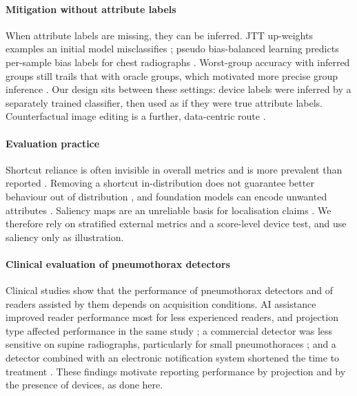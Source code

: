 \documentclass{ieeeaccess}
\begin{document}
\paragraph{Mitigation without attribute labels}
When attribute labels are missing, they can be inferred. JTT up-weights examples an initial model misclassifies \cite{liu2021jtt}; pseudo bias-balanced learning predicts per-sample bias labels for chest radiographs \cite{luo2022pbbl}. Worst-group accuracy with inferred groups still trails that with oracle groups, which motivated more precise group inference \cite{han2024gic}. Our design sits between these settings: device labels were inferred by a separately trained classifier, then used as if they were true attribute labels. Counterfactual image editing is a further, data-centric route \cite{cooke2026roentmod}.

\paragraph{Evaluation practice}
Shortcut reliance is often invisible in overall metrics and is more prevalent than reported \cite{unnikrishnan2024pest,vasquez2024cleverhans}. Removing a shortcut in-distribution does not guarantee better behaviour out of distribution \cite{yang2024limits}, and foundation models can encode unwanted attributes \cite{glocker2023foundation}. Saliency maps are an unreliable basis for localisation claims \cite{saporta2022saliency,arun2021saliency}. We therefore rely on stratified external metrics and a score-level device test, and use saliency only as illustration.

\paragraph{Clinical evaluation of pneumothorax detectors}
Clinical studies show that the performance of pneumothorax detectors and of readers assisted by them depends on acquisition conditions. AI assistance improved reader performance most for less experienced readers, and projection type affected performance in the same study \cite{ho2025readers}; a commercial detector was less sensitive on supine radiographs, particularly for small pneumothoraces \cite{nakamura2026supine}; and a detector combined with an electronic notification system shortened the time to treatment \cite{oh2025notification}. These findings motivate reporting performance by projection and by the presence of devices, as done here.
\end{document}
